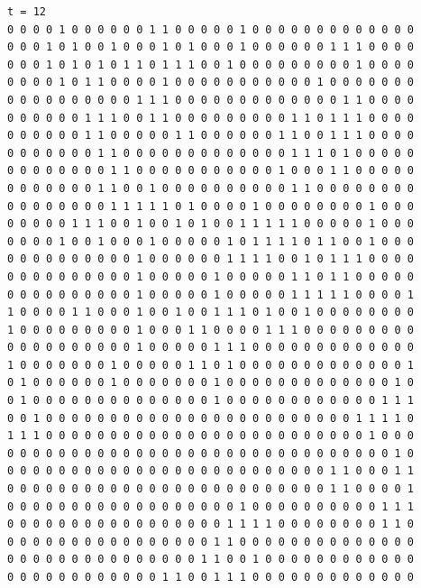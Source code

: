 \documentclass[a4paper,12pt]{article}
\begin{document}
\begin{verbatim}
t = 12
0 0 0 0 1 0 0 0 0 0 0 1 1 0 0 0 0 0 1 0 0 0 0 0 0 0 0 0 0 0 0 0 
0 0 0 1 0 1 0 0 1 0 0 0 1 0 1 0 0 0 1 0 0 0 0 0 0 1 1 1 0 0 0 0 
0 0 0 1 0 1 0 1 0 1 1 0 1 1 1 0 0 1 0 0 0 0 0 0 0 0 0 1 0 0 0 0 
0 0 0 0 1 0 1 1 0 0 0 0 1 0 0 0 0 0 0 0 0 0 0 0 1 0 0 0 0 0 0 0 
0 0 0 0 0 0 0 0 0 0 1 1 1 0 0 0 0 0 0 0 0 0 0 0 0 0 1 1 0 0 0 0 
0 0 0 0 0 0 1 1 1 0 0 1 1 0 0 0 0 0 0 0 0 0 1 1 0 1 1 1 0 0 0 0 
0 0 0 0 0 0 1 1 0 0 0 0 0 1 1 0 0 0 0 0 0 1 1 0 0 1 1 1 0 0 0 0 
0 0 0 0 0 0 0 1 1 0 0 0 0 0 0 0 0 0 0 0 0 0 1 1 1 0 1 0 0 0 0 0 
0 0 0 0 0 0 0 0 1 1 0 0 0 0 0 0 0 0 0 0 0 1 0 0 0 1 1 0 0 0 0 0 
0 0 0 0 0 0 0 1 1 0 0 1 0 0 0 0 0 0 0 0 0 0 1 1 0 0 0 0 0 0 0 0 
0 0 0 0 0 0 0 0 1 1 1 1 1 0 1 0 0 0 0 1 0 0 0 0 0 0 0 0 1 0 0 0 
0 0 0 0 0 1 1 1 0 0 1 0 0 1 0 1 0 0 1 1 1 1 1 0 0 0 0 0 1 0 0 0 
0 0 0 0 1 0 0 1 0 0 0 1 0 0 0 0 0 1 0 1 1 1 1 0 1 1 0 0 1 0 0 0 
0 0 0 0 0 0 0 0 0 0 1 0 0 0 0 0 0 1 1 1 1 0 0 1 0 1 1 1 0 0 0 0 
0 0 0 0 0 0 0 0 0 0 1 0 0 0 0 0 1 0 0 0 0 0 1 1 0 1 1 0 0 0 0 0 
0 0 0 0 0 0 0 0 0 0 1 0 0 0 0 0 1 0 0 0 0 0 1 1 1 1 1 0 0 0 0 1 
1 0 0 0 0 1 1 0 0 0 1 0 0 1 0 0 1 1 1 0 1 0 0 1 0 0 0 0 0 0 0 0 
1 0 0 0 0 0 0 0 0 0 1 0 0 0 1 1 0 0 0 0 1 1 1 0 0 0 0 0 0 0 0 0 
0 0 0 0 0 0 0 0 0 0 1 0 0 0 0 0 1 1 1 0 0 0 0 0 0 0 0 0 0 0 0 0 
1 0 0 0 0 0 0 0 1 0 0 0 0 0 1 1 0 1 0 0 0 0 0 0 0 0 0 0 0 0 0 1 
0 1 0 0 0 0 0 0 1 0 0 0 0 0 0 0 1 0 0 0 0 0 0 0 0 0 0 0 0 0 1 0 
0 1 0 0 0 0 0 0 0 0 0 0 0 0 0 0 1 0 0 0 0 0 0 0 0 0 0 0 0 1 1 1 
0 0 1 0 0 0 0 0 0 0 0 0 0 0 0 0 0 0 0 0 0 0 0 0 0 0 0 1 1 1 1 0 
1 1 1 0 0 0 0 0 0 0 0 0 0 0 0 0 0 0 0 0 0 0 0 0 0 0 0 0 1 0 0 0 
0 0 0 0 0 0 0 0 0 0 0 0 0 0 0 0 0 0 0 0 0 0 0 0 0 0 0 0 0 0 1 0 
0 0 0 0 0 0 0 0 0 0 0 0 0 0 0 0 0 0 0 0 0 0 0 0 0 1 1 0 0 0 1 1 
0 0 0 0 0 0 0 0 0 0 0 0 0 0 0 0 0 0 0 0 0 0 0 0 0 1 1 0 0 0 0 1 
0 0 0 0 0 0 0 0 0 0 0 0 0 0 0 0 0 0 1 0 0 0 0 0 0 0 0 0 0 1 1 1 
0 0 0 0 0 0 0 0 0 0 0 0 0 0 0 0 0 1 1 1 1 0 0 0 0 0 0 0 0 1 1 0 
0 0 0 0 0 0 0 0 0 0 0 0 0 0 0 0 1 1 0 0 0 0 0 0 0 0 0 0 0 0 0 0 
0 0 0 0 0 0 0 0 0 0 0 0 0 0 0 1 1 0 0 1 0 0 0 0 0 0 0 0 0 0 0 0 
0 0 0 0 0 0 0 0 0 0 0 0 1 1 0 0 1 1 1 0 0 0 0 0 0 0 0 0 0 0 0 0 




\end{verbatim}
\end{document}
